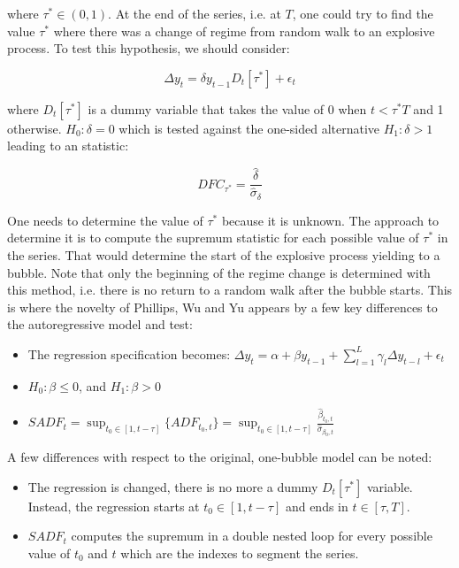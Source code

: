 where $\tau^{*} \in (0,1)$. At the end of the series, i.e. at $T$, one
could try to find the value $\tau^{*}$ where there was a change of regime from
random walk to an explosive process. To test this hypothesis, we should
consider:

\[ \Delta y_{t} = \delta y_{t-1} D_t[\tau^{*}] + \epsilon_{t}\]

where $D_t[\tau^{*}]$ is a dummy variable that takes the value of 0 when
$t < \tau^{*}T$ and 1 otherwise. $H_{0}: \delta = 0$ which is tested against the
one-sided alternative $H_{1}: \delta > 1$ leading to an statistic:

\[ DFC_{\tau^{*}} = \frac{\hat{\delta}}{\hat{\sigma}_{\delta}} \]

One needs to determine the value of $\tau^{*}$ because it is unknown. The
approach to determine it is to compute the supremum statistic for each possible
value of $\tau^{*}$ in the series. That would determine the start of the explosive
process yielding to a bubble. Note that only the beginning of the regime change
is determined with this method, i.e. there is no return to a random walk after
the bubble starts. This is where the novelty of Phillips, Wu and Yu appears by
a few key differences to the autoregressive model and test:

\begin{itemize}
  \item The regression specification becomes: $ \Delta y_t = \alpha + \beta y_{t-1} + \sum_{l=1}^{L} \gamma_{l} \Delta y_{t-l} + \epsilon_t$
  \item $H_{0}: \beta \le 0$, and $H_{1}: \beta > 0$
  \item $SADF_t = \sup_{t_{0} \in [1, t-\tau]} \{ADF_{t_{0},t}\} = \sup_{t_{0} \in [1, t-\tau]} \frac{\hat{\beta}_{t_{0},t}}{\hat{\sigma}_{\beta_{0},t}}$
\end{itemize}

A few differences with respect to the original, one-bubble model can be noted:

\begin{itemize}
  \item The regression is changed, there is no more a dummy $D_t[\tau^{*}]$
        variable. Instead, the regression starts at $t_{0} \in [1, t-\tau]$ and
        ends in $t \in [\tau, T]$.
  \item $SADF_t$ computes the supremum in a double nested loop for every
        possible value of $t_0$ and $t$ which are the indexes to segment the
        series.
\end{itemize}

